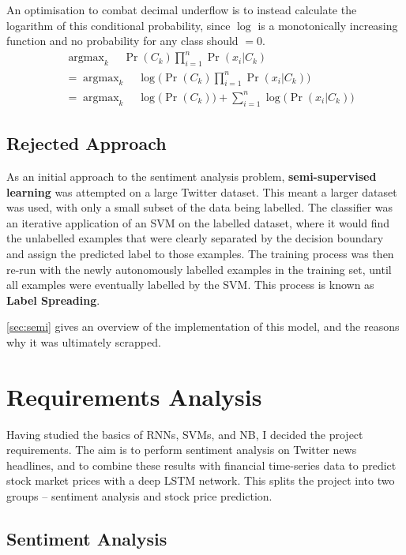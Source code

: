 \documentclass[12pt,a4paper,twoside,openright]{report}
\DeclareMathOperator*{\argmax}{argmax}
\begin{document}
An optimisation to combat decimal underflow is to instead calculate the logarithm of this conditional probability,
since $\log$ is a monotonically increasing function and no probability for any class should $= 0$.
\begin{align}
&\argmax_k\quad \Pr(C_k)\prod_{i=1}^n \Pr(x_i | C_k)\\
&=\argmax_k\quad \log\Big(\Pr(C_k)\prod_{i=1}^n \Pr(x_i | C_k)\Big)\\
&= \argmax_k\quad \log\big(\Pr(C_k)\big) + \sum_{i=1}^n \log\big(\Pr(x_i | C_k)\big)
\end{align}

\subsection{Rejected Approach}
\label{sec:prepRej}

As an initial approach to the sentiment analysis problem, \textbf{semi-supervised learning} was attempted
on a large Twitter dataset. This meant a larger dataset
was used, with only a small subset of the data being labelled. The classifier was an iterative application
of an SVM on the labelled dataset, where it would find the unlabelled examples that were clearly
separated by the decision boundary and assign the predicted label to those examples. The training process
was then re-run with the newly autonomously labelled examples in the training set, until all examples
were eventually labelled by the SVM. This process is known as \textbf{Label Spreading}.

\cref{sec:semi} gives an overview of the implementation of this model, and the reasons why it was
ultimately scrapped.

\section{Requirements Analysis}
\label{sec:introReq}
Having studied the basics of RNNs, SVMs, and
NB, I decided the project requirements. The aim is to
perform sentiment analysis on Twitter news headlines, and to combine these results with financial time-series data
to predict stock market prices with a deep LSTM network. This splits the project into two groups --
sentiment analysis and stock price prediction.

\subsection*{Sentiment Analysis}
\end{document}
